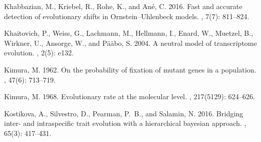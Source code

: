 \documentclass{article}
\begin{document}
\begin{thebibliography}{}
    Khabbazian, M., Kriebel, R., Rohe, K., and An{\'e}, C. 2016.
    \newblock Fast and accurate detection of evolutionary shifts in
        {{Ornstein}}--{{Uhlenbeck}} models.
    , {7}(7): 811--824.

    Khaitovich, P., Weiss, G., Lachmann, M., Hellmann, I., Enard, W., Muetzel, B.,
    Wirkner, U., Ansorge, W., and P{\"a}{\"a}bo, S. 2004.
    \newblock A neutral model of transcriptome evolution.
    , {2}(5): e132.

    Kimura, M. 1962.
    \newblock On the probability of fixation of mutant genes in a population.
    , {47}(6): 713--719.

    Kimura, M. 1968.
    \newblock Evolutionary rate at the molecular level.
    , {217}(5129): 624--626.

    Kostikova, A., Silvestro, D., Pearman, P.~B., and Salamin, N. 2016.
    \newblock Bridging inter- and intraspecific trait evolution with a hierarchical
    bayesian approach.
    , {65}(3): 417--431.


\end{thebibliography}
\end{document}
